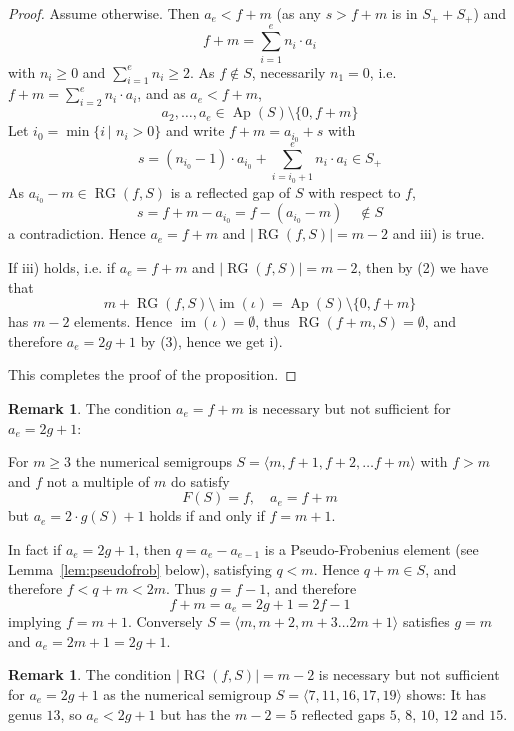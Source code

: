 \documentclass[a4paper,12pt,scrbook]{amsart}
\theoremstyle{plain}%
\theoremstyle{definition}
\newtheorem{notiz}[satz]{Remark}
\begin{document}
\begin{proof}
Assume otherwise. Then $a_e < f+m$ (as any $s > f+m$ is in $S_++S_+$) and 
	$$ f+m = \sum\limits_{i=1}^e n_i \cdot a_i $$
with $n_i \geq 0$ and $\sum\limits_{i=1}^e n_i \geq 2$. As $f \notin S$, 
necessarily $n_1 = 0$, i.e. $ f+m = \sum\limits_{i=2}^e n_i \cdot a_i $, and as 
$a_e < f+m$, 
	$$ a_2, \ldots, a_e \in \operatorname{Ap}(S) \setminus \{0, f+m\} $$ 
Let $i_0 = \operatorname{min}\{i \, \vert \,\, n_i > 0\}$ and write 
	$ f+m = a_{i_0} + s $
with 
	$$ s = \left(n_{i_0}-1\right) \cdot a_{i_0} + \sum\limits_{i=i_0+1}^e n_i \cdot a_i 
	\in S_+ $$
As $a_{i_0} - m \in \operatorname{RG}(f, S)$ 
is a reflected gap of $S$ with respect to $f$,  
	$$ s = f + m - a_{i_0} = f - \left(a_{i_0} - m\right) \quad \notin S $$
a contradiction. Hence $a_e = f+m$ and $\vert \operatorname{RG}(f, S) \vert = m-2$ 
and iii) is true.

If iii) holds, i.e. if $a_e = f+m$ and $\vert \operatorname{RG}(f, S) \vert = m-2$, 
then by (2) we have that 
	$$ m + \operatorname{RG}(f, S) \setminus \operatorname{im}(\iota) 
	= \operatorname{Ap}(S) \setminus \{0, f+m\} $$ 
has $m-2$ elements. Hence $\operatorname{im}(\iota) = \emptyset$, thus 
$\operatorname{RG}(f+m, S) = \emptyset$, and therefore $a_e = 2g+1$ by (3), 
hence we get i). 

This completes the proof of the proposition.  

\end{proof}

\begin{notiz}
The condition $a_e = f+m$ is necessary but not sufficient for $a_e = 2g+1$: 

For $m \geq 3$ the numerical semigroups $S = \langle m, f+1, f+2, \ldots f+m\rangle$ 
with $f > m$ and $f$ not a multiple of $m$ do satisfy 
	$$ F(S) = f, \quad a_e = f + m $$
but $a_e = 2 \cdot g(S) + 1$ holds if and only if $f = m+1$. 

In fact if $a_e = 2g+1$, then $q=a_e-a_{e-1}$ is a  Pseudo-Frobenius element 
(see Lemma~\ref{lem:pseudofrob} below), satisfying $q <m$. Hence 
$q+m \in S$, and therefore $f < q+m < 2m$. Thus $g = f-1$, and therefore 
	$$ f+m = a_e = 2g+1 = 2f-1 $$ 
implying $f = m+1$. Conversely $S =  \langle m, m+2, m+3 \ldots 2m+1\rangle$ 
satisfies $g = m$ and $a_e = 2m+1 = 2g+1$. 
\end{notiz}

\begin{notiz}
The condition $\vert \operatorname{RG}(f, S) \vert = m-2$ is necessary but not 
sufficient for $a_e = 2g+1$ as the numerical semigroup $S = \langle 7, 11, 16, 17, 19 
\rangle$ shows: It has genus $13$, so $a_e < 2g+1$ but has the $m-2=5$ reflected 
gaps $5$, $8$, $10$, $12$ and $15$. 
\end{notiz}
\end{document}
